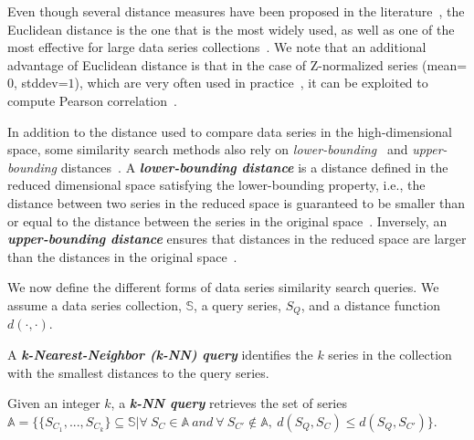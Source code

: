 Even though several distance measures have been proposed in the literature~\cite{berndt1994using,das1997finding,DBLP:conf/edbt/AssfalgKKKPR06,DBLP:conf/icde/ChenNOT07,journal/dmkd/Wang2013,DBLP:conf/ssdbm/MirylenkaDP17}, the Euclidean distance is the one that is the most widely used, as well as one of the most effective for large data series collections~\cite{conf/vldb/Ding2008}.
We note that an additional advantage of Euclidean distance is that in the case of Z-normalized series (mean=$0$, stddev=$1$), which are very often used in practice~\cite{conf/kdd/Zoumpatianos2015}, it can be exploited to compute Pearson correlation~\cite{conf/icde/Rafiei99}.

In addition to the distance used to compare data series in the high-dimensional space, some similarity search methods also rely on \textit{lower-bounding}~\cite{journal/kais/Camerra2014,journal/vldb/Zoumpatianos2016,journal/edbt/Schafer2012,conf/vldb/Wang2013,dpisax,ulisse,conf/vldb/Ciaccia1997,conf/kdd/Karras2011} and \textit{upper-bounding} distances~\cite{conf/vldb/Wang2013,conf/kdd/Karras2011}. 
A \textit{\textbf{lower-bounding distance}} is a distance defined in the reduced dimensional space satisfying the lower-bounding property, i.e., the distance between two series in the reduced space is guaranteed to be smaller than or equal to the distance between the series in the original space~\cite{conf/sigmod/Faloutsos1994}. 
Inversely, an \textit{\textbf{upper-bounding distance}} ensures that distances in the reduced space are larger than the distances in the original space~\cite{conf/vldb/Wang2013,conf/kdd/Karras2011}.

We now define the different forms of data series similarity search queries.
We assume a data series collection, $\mathbb{S}$, a query series, $S_Q$, and a distance function $d(\cdot,\cdot)$.

A \textit{\textbf{k-Nearest-Neighbor (k-NN) query}} identifies the $k$ series in the collection with the smallest distances to the query series.

\begin{defn} \label{def:knnquery}
Given an integer $k$, a \textit{\textbf{k-NN query}} retrieves the set of series $\mathbb{A} = \{ \{S_{C_1},...,S_{C_k}\} \subseteq \mathbb{S} | \forall \ S_C \in \mathbb{A} \ and \ \forall \ S_{C'} \notin \mathbb{A}, \ d(S_Q,S_C) \leq d(S_Q,S_{C'})\}$.
\end{defn}


